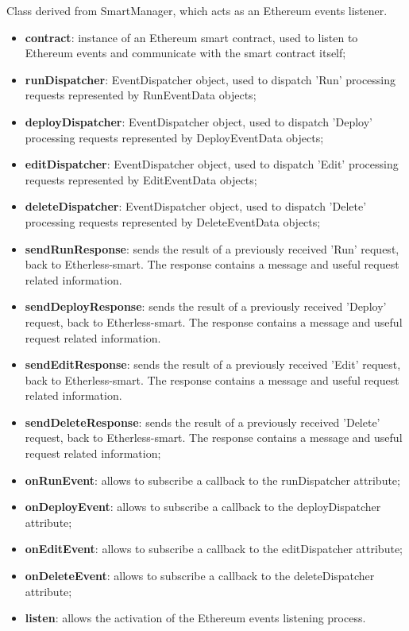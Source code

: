 	Class derived from SmartManager, which acts as an Ethereum events listener.
	\begin{itemize}
		\item \textbf{contract}: instance of an Ethereum smart contract, used to listen to Ethereum events and communicate with the smart contract itself;
		\item \textbf{runDispatcher}: EventDispatcher object, used to dispatch 'Run' processing requests represented by RunEventData objects;
		\item \textbf{deployDispatcher}: EventDispatcher object, used to dispatch 'Deploy' processing requests represented by DeployEventData objects;
		\item \textbf{editDispatcher}: EventDispatcher object, used to dispatch 'Edit' processing requests represented by EditEventData objects;
		\item \textbf{deleteDispatcher}: EventDispatcher object, used to dispatch 'Delete' processing requests represented by DeleteEventData objects;
	\end{itemize}
	\begin{itemize}
		\item \textbf{sendRunResponse}: sends the result of a previously received 'Run' request, back to Etherless-smart. The response contains a message and useful request related information.
		\item \textbf{sendDeployResponse}: sends the result of a previously received 'Deploy' request, back to Etherless-smart. The response contains a message and useful request related information.
		\item \textbf{sendEditResponse}: sends the result of a previously received 'Edit' request, back to Etherless-smart. The response contains a message and useful request related information.
		\item \textbf{sendDeleteResponse}: sends the result of a previously received 'Delete' request, back to Etherless-smart. The response contains a message and useful request related information;
		\item \textbf{onRunEvent}: allows to subscribe a callback to the runDispatcher attribute;
		\item \textbf{onDeployEvent}: allows to subscribe a callback to the deployDispatcher attribute;
		\item \textbf{onEditEvent}: allows to subscribe a callback to the editDispatcher attribute;
		\item \textbf{onDeleteEvent}: allows to subscribe a callback to the deleteDispatcher attribute;
		\item \textbf{listen}: allows the activation of the Ethereum events listening process.
	\end{itemize}

